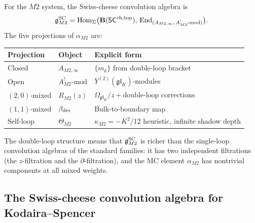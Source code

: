 \begin{computation}
For the $M2$ system, the Swiss-cheese convolution algebra is
\begin{equation}%
\gSC_{M2}
= \Hom_{\Sigma}\bigl(
\mathbf{B}(\SCop),\,
\End_{(A_{M2,\infty},\,A^!_{M2}\text{-mod})}
\bigr).
\end{equation}
The five projections of $\alpha_{M2}$ are:
\begin{center}
\renewcommand{\arraystretch}{1.25}
\begin{tabular}{lll}
\textbf{Projection} & \textbf{Object} & \textbf{Explicit form} \\
\hline
Closed & $A_{M2,\infty}$ &
$\{m_k\}$ from double-loop bracket \\
Open & $A^!_{M2}\text{-mod}$
& $Y^{(2)}(\mathfrak{gl}_K)$-modules \\
$(2,0)$-mixed & $R_{M2}(z)$
& $\Omega_{\mathfrak{gl}_K}/z + \text{double-loop corrections}$ \\
$(1,1)$-mixed & $\beta_{\mathrm{der}}$
& Bulk-to-boundary map \\
Self-loop & $\Theta_{M2}$
& $\kappa_{M2} = -K^2/12$ heuristic, infinite shadow depth
\end{tabular}
\end{center}
The double-loop structure means that $\mathfrak{g}^{\mathrm{SC}}_{M2}$ is richer than
the single-loop convolution algebras of the standard families:
it has two independent filtrations (the $z$-filtration and the
$\partial$-filtration), and the MC element $\alpha_{M2}$ has
nontrivial components at all mixed weights.
\end{computation}


\subsection{The Swiss-cheese convolution algebra for Kodaira--Spencer}

